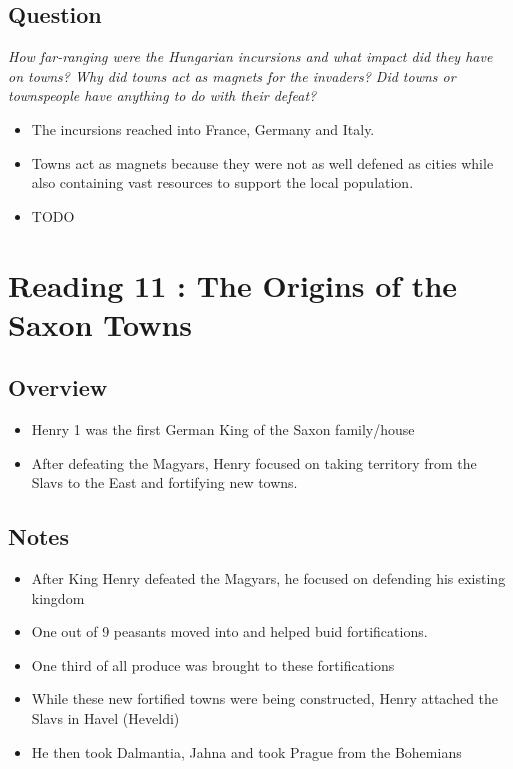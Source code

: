 \documentclass[12pt]{article}
\begin{document}
{\subsection*{Question}

\textit{How far-ranging were the Hungarian incursions and what impact did they have on towns? Why did towns act as magnets for the invaders? Did towns or townspeople have anything to do with their defeat?}

\begin{itemize}
	\item The incursions reached into France, Germany and Italy.
	\item Towns act as magnets because they were not as well defened as cities while also containing vast resources to support the local population.
	\item TODO

\end{itemize}


\section*{Reading 11 : The Origins of the Saxon Towns}

\subsection*{Overview}

\begin{itemize}
	\item Henry 1 was the first German King of the Saxon family/house
	\item After defeating the Magyars, Henry focused on taking territory from the Slavs to the East and fortifying new towns.
\end{itemize}

\subsection*{Notes}

\begin{itemize}
	\item After King Henry defeated the Magyars, he focused on defending his existing kingdom
	\item One out of 9 peasants moved into and helped buid fortifications. 
	\item One third of all produce was brought to these fortifications
	\item While these new fortified towns were being constructed, Henry attached the Slavs in Havel (Heveldi)
	\item He then took Dalmantia, Jahna and took Prague from the Bohemians
\end{itemize}

}
\end{document}
